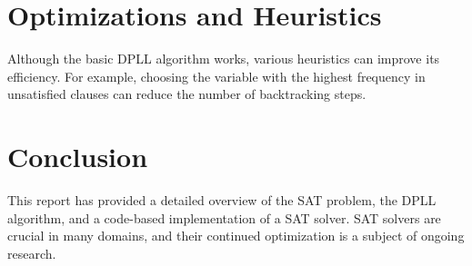 \documentclass[12pt]{article}
\begin{document}
\section{Optimizations and Heuristics}
Although the basic DPLL algorithm works, various heuristics can improve its efficiency. For example, choosing the variable with the highest frequency in unsatisfied clauses can reduce the number of backtracking steps.

\section{Conclusion}
This report has provided a detailed overview of the SAT problem, the DPLL algorithm, and a code-based implementation of a SAT solver. SAT solvers are crucial in many domains, and their continued optimization is a subject of ongoing research.
\end{document}
